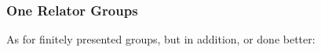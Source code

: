 \subsubsection{One Relator Groups}

As for finitely presented groups, but in addition, or done better:


\begin{enumerate}


\end{enumerate}
